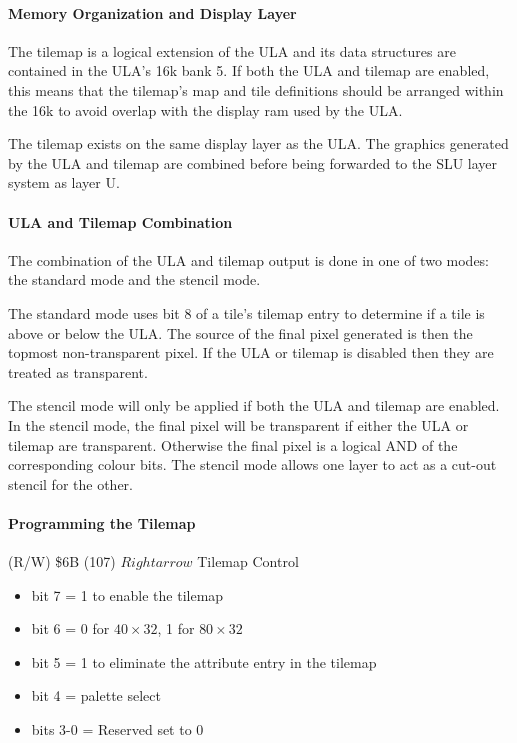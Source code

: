 \paragraph{Memory Organization and Display Layer}

The tilemap is a logical extension of the ULA and its data structures
are contained in the ULA's 16k bank 5.  If both the ULA and tilemap
are enabled, this means that the tilemap's map and tile definitions
should be arranged within the 16k to avoid overlap with the display
ram used by the ULA.

The tilemap exists on the same display layer as the ULA. The graphics
generated by the ULA and tilemap are combined before being forwarded
to the SLU layer system as layer U.

\paragraph{ULA and Tilemap Combination}
The combination of the ULA and tilemap output is done in one of two modes: 
the standard mode and the stencil mode.

The standard mode uses bit 8 of a tile's tilemap entry to determine if
a tile is above or below the ULA. The source of the final pixel
generated is then the topmost non-transparent pixel.  If the ULA or
tilemap is disabled then they are treated as transparent.

The stencil mode will only be applied if both the ULA and tilemap are
enabled. In the stencil mode, the final pixel will be transparent if
either the ULA or tilemap are transparent. Otherwise the final pixel
is a logical AND of the corresponding colour bits. The stencil mode
allows one layer to act as a cut-out stencil for the other.

\paragraph{Programming the Tilemap}
(R/W) \$6B (107) $Rightarrow$ Tilemap Control
\begin{itemize}
\item bit 7 = 1 to enable the tilemap
\item bit 6 = 0 for $40\times32$, 1 for $80\times32$
\item bit 5 = 1 to eliminate the attribute entry in the tilemap
\item bit 4 = palette select
\item bits 3-0 = Reserved set to 0
\end{itemize}

